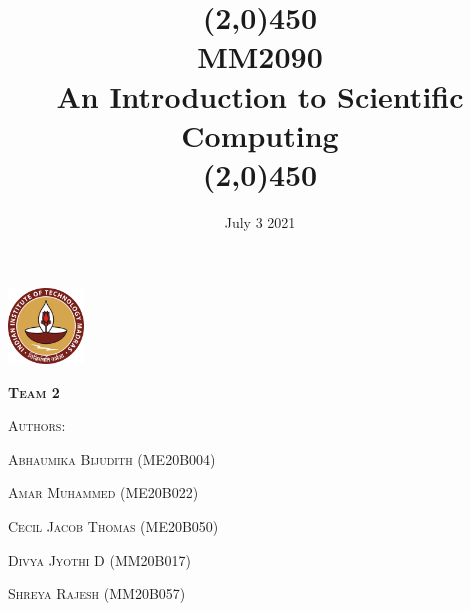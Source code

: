 \documentclass[12pt]{article}
\title{\line(2,0){450}\\ \bfseries{MM2090 \\ An Introduction to Scientific Computing }\\ \line(2,0){450}}
\date{}
\begin{document}
\begin{titlepage}
\maketitle
\begin{center}
	\includegraphics[width=0.15\textwidth]{IITM_pic.png}\par\vspace{1cm}
	\vspace{1cm}
	{\scshape\LARGE \textbf{Team 2} \par}
	\vspace{1cm}
	{\scshape\LARGE Authors: \par}
	\vspace{1cm}
	{\scshape Abhaumika Bijudith (ME20B004) \par}
	\vspace{0.5cm}
	{\scshape Amar Muhammed (ME20B022)     \par}
	\vspace{0.5cm}
	{\scshape Cecil Jacob Thomas (ME20B050) \par}
	\vspace{0.5cm}
	{\scshape Divya Jyothi D (MM20B017)	\par}
	\vspace{0.5cm}
	{\scshape Shreya Rajesh (MM20B057)	\par}
	\vfill


	\vfill

	{\large \date{July 3 2021}\par}
\end{center}
\end{titlepage}
\end{document}

